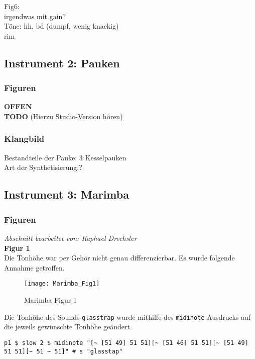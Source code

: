 \documentclass[
10pt, %
a4paper, %
oneside, %
headinclude,footinclude, %
BCOR5mm, %
]{scrartcl}
\begin{document}
Fig6:\\
irgendwas mit gain?\\



Töne: hh, bd (dumpf, wenig knackig)\\
rim

\subsection{Instrument 2: Pauken}
\subsubsection{Figuren}
{\color{red}\textbf{OFFEN}} \\
{\color{red}\textbf{TODO}}
(Hierzu Studio-Version hören)\\

\subsubsection{Klangbild}
Bestandteile der Pauke: 3 Kesselpauken\\
Art der Synthetisierung:?\\


\subsection{Instrument 3: Marimba}
\subsubsection{Figuren}
\textit{Abschnitt bearbeitet von: Raphael Drechsler}\\

\noindent \textbf{Figur 1}\\
Die Tonhöhe war per Gehör nicht genau differenzierbar. Es wurde folgende Annahme getroffen.
\begin{figure}[h]
	\centering 
	\texttt{[image: Marimba\_Fig1]} 
	\caption{Marimba Figur 1}
\end{figure}

\noindent Die Tonhöhe des Sounds \verb|glasstrap| wurde mithilfe des \verb|midinote|-Ausdrucks \cite{tid6} auf die jeweils gewünschte Tonhöhe geändert.
\begin{lstlisting}
p1 $ slow 2 $ midinote "[~ [51 49] 51 51][~ [51 46] 51 51][~ [51 49] 51 51][~ 51 ~ 51]" # s "glasstap"
\end{lstlisting}
\end{document}
